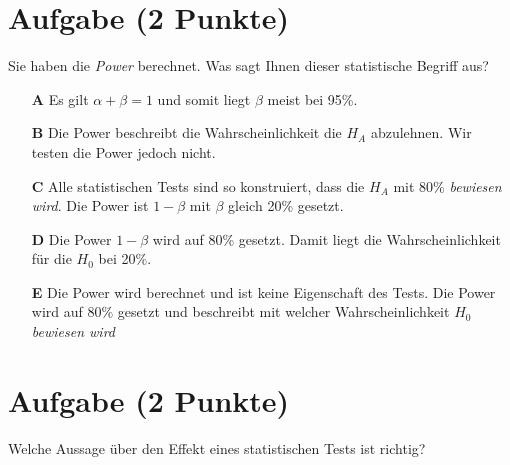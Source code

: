 \documentclass[a4paper, 9pt]{scrartcl}\usepackage[]{graphicx}\usepackage[]{xcolor}
\begin{document}
\section{Aufgabe \hfill (2 Punkte)}



Sie haben die \textit{Power} berechnet. Was sagt Ihnen dieser statistische Begriff aus?



\begin{enumerate}
\item [\textbf{A} \msquare] Es gilt $\alpha + \beta = 1$ und somit liegt $\beta$ meist bei 95\%.
\item [\textbf{B} \msquare] Die Power beschreibt die Wahrscheinlichkeit die $H_A$ abzulehnen. Wir testen die Power jedoch nicht.
\item [\textbf{C} \msquare] Alle statistischen Tests sind so konstruiert, dass die $H_A$ mit 80\% \textit{bewiesen wird}. Die Power ist $1-\beta$ mit $\beta$ gleich 20\% gesetzt.
\item [\textbf{D} \msquare] Die Power $1-\beta$ wird auf 80\% gesetzt. Damit liegt die Wahrscheinlichkeit für die $H_0$ bei 20\%.
\item [\textbf{E} \msquare] Die Power wird berechnet und ist keine Eigenschaft des Tests. Die Power wird auf $80\%$ gesetzt und beschreibt mit welcher Wahrscheinlichkeit $H_0$ \textit{bewiesen wird}
\end{enumerate}

\section{Aufgabe \hfill (2 Punkte)}



Welche Aussage über den Effekt eines statistischen Tests ist richtig?
\end{document}
